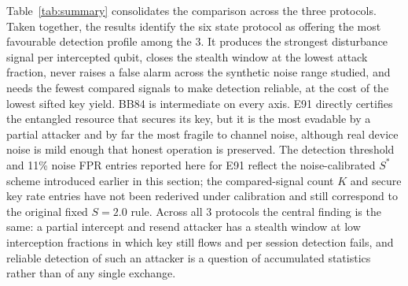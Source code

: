\documentclass[conference]{IEEEtran}
\begin{document}
Table~\ref{tab:summary} consolidates the comparison across the three protocols.
Taken together, the results identify the six state protocol as offering the most
favourable detection profile among the 3. It produces the strongest
disturbance signal per intercepted qubit, closes the stealth window at the lowest
attack fraction, never raises a false alarm across the synthetic noise range
studied, and needs the fewest compared signals to make detection reliable, at the
cost of the lowest sifted key yield. BB84 is intermediate on every axis. E91
directly certifies the entangled resource that secures its key, but it is the most
evadable by a partial attacker and by far the most fragile to channel noise,
although real device noise is mild enough that honest operation is preserved. The detection threshold and 11\% noise FPR entries reported here for E91 reflect the noise-calibrated $S^{*}$ scheme introduced earlier in this section; the compared-signal count $K$ and secure key rate entries have not been rederived under calibration and still correspond to the original fixed $S=2.0$ rule.
Across all 3 protocols the central finding is the same: a partial intercept
and resend attacker has a stealth window at low interception fractions in which
key still flows and per session detection fails, and reliable detection of such an
attacker is a question of accumulated statistics rather than of any single
exchange.
\end{document}
